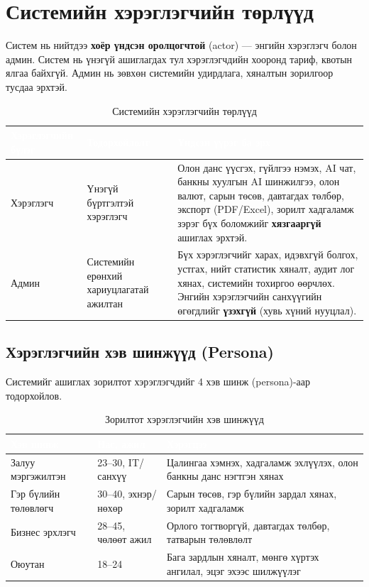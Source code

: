 \section{Системийн хэрэглэгчийн төрлүүд}
Систем нь нийтдээ \textbf{хоёр үндсэн оролцогчтой} (actor) --- энгийн хэрэглэгч болон админ. Систем нь үнэгүй ашиглагдах тул хэрэглэгчдийн хооронд тариф, квотын ялгаа байхгүй. Админ нь зөвхөн системийн удирдлага, хяналтын зорилгоор тусдаа эрхтэй.

\begin{table}[ht]
\centering
\footnotesize
\renewcommand{\arraystretch}{1.3}
\begin{tabular}{|p{2.4cm}|p{3.4cm}|p{8cm}|}
\hline
\rowcolor{darknavy}
\textcolor{white}{\textbf{Хэрэглэгчийн бүлэг}} & \textcolor{white}{\textbf{Тодорхойлолт}} & \textcolor{white}{\textbf{Үндсэн үүрэг ба эрх}} \\ \hline
Хэрэглэгч & Үнэгүй бүртгэлтэй хэрэглэгч & Олон данс үүсгэх, гүйлгээ нэмэх, AI чат, банкны хуулгын AI шинжилгээ, олон валют, сарын төсөв, давтагдах төлбөр, экспорт (PDF/Excel), зорилт хадгаламж зэрэг бүх боломжийг \textbf{хязгааргүй} ашиглах эрхтэй. \\ \hline
Админ & Системийн ерөнхий хариуцлагатай ажилтан & Бүх хэрэглэгчийг харах, идэвхгүй болгох, устгах, нийт статистик хяналт, аудит лог хянах, системийн тохиргоо өөрчлөх. Энгийн хэрэглэгчийн санхүүгийн өгөгдлийг \textbf{үзэхгүй} (хувь хүний нууцлал). \\ \hline
\end{tabular}
\caption{Системийн хэрэглэгчийн төрлүүд}
\label{tab:user-types}
\end{table}

\subsection{Хэрэглэгчийн хэв шинжүүд (Persona)}
Системийг ашиглах зорилтот хэрэглэгчдийг 4 хэв шинж (persona)-аар тодорхойлов.

\begin{table}[ht]
\centering
\footnotesize
\renewcommand{\arraystretch}{1.3}
\begin{tabular}{|p{2.7cm}|p{2.5cm}|p{8cm}|}
\hline
\rowcolor{darknavy}
\textcolor{white}{\textbf{Хэв шинж}} & \textcolor{white}{\textbf{Нас, ажил}} & \textcolor{white}{\textbf{Хэрэгцээ}} \\ \hline
Залуу мэргэжилтэн & 23--30, IT/санхүү & Цалингаа хэмнэх, хадгаламж эхлүүлэх, олон банкны данс нэгтгэн хянах \\ \hline
Гэр бүлийн төлөвлөгч & 30--40, эхнэр/нөхөр & Сарын төсөв, гэр бүлийн зардал хянах, зорилт хадгаламж \\ \hline
Бизнес эрхлэгч   & 28--45, чөлөөт ажил & Орлого тогтворгүй, давтагдах төлбөр, татварын төлөвлөлт \\ \hline
Оюутан           & 18--24             & Бага зардлын хяналт, мөнгө хүртэх ангилал, эцэг эхээс шилжүүлэг \\ \hline
\end{tabular}
\caption{Зорилтот хэрэглэгчийн хэв шинжүүд}
\label{tab:personas}
\end{table}

